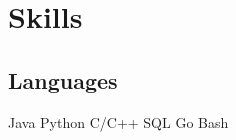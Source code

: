 \documentclass[]{openfont}
\begin{document}
\begin{minipage}[t]{0.33\textwidth}








    \section{Skills}

    \subsection{Languages}
    Java \textbullet{} Python \textbullet{} C/C++ \textbullet{} SQL \textbullet{} Go \textbullet{} Bash
    \sectionsep


\end{minipage}
\end{document}
